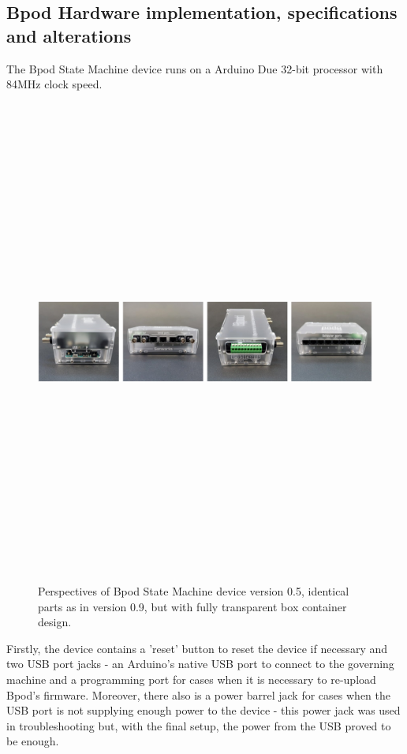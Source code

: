 \subsection{Bpod Hardware implementation, specifications and alterations}
\label{subsec:subbsectionB}

The Bpod State Machine device runs on a Arduino Due 32-bit processor with 84MHz clock speed. 
\begin{figure}[H] \centering \includegraphics[width=16cm,height=16cm,keepaspectratio]{Figures/3.Chapter/bpodangles.png} 
\caption{Perspectives of Bpod State Machine device version 0.5, identical parts as in version 0.9, but with fully transparent box container design.} 
\end{figure}
Firstly, the device contains a 'reset' button to reset the device if necessary and two USB port jacks - an Arduino's native USB port to connect to the governing machine and a programming port for cases when it is necessary to re-upload Bpod's firmware. Moreover, there also is a power barrel jack for cases when the USB port is not supplying enough power to the device - this power jack was used in troubleshooting but, with the final setup, the power from the USB proved to be enough.


